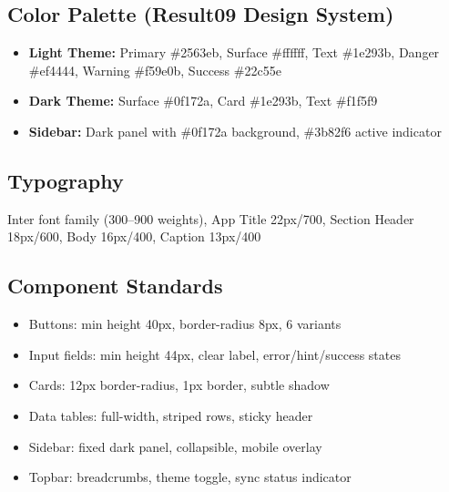 \subsection{Color Palette (Result09 Design System)}
\begin{itemize}[nosep]
    \item \textbf{Light Theme:} Primary \#2563eb, Surface \#ffffff, Text \#1e293b, Danger \#ef4444, Warning \#f59e0b, Success \#22c55e
    \item \textbf{Dark Theme:} Surface \#0f172a, Card \#1e293b, Text \#f1f5f9
    \item \textbf{Sidebar:} Dark panel with \#0f172a background, \#3b82f6 active indicator
\end{itemize}

\subsection{Typography}
Inter font family (300--900 weights), App Title 22px/700, Section Header 18px/600, Body 16px/400, Caption 13px/400

\subsection{Component Standards}
\begin{itemize}[nosep]
    \item Buttons: min height 40px, border-radius 8px, 6 variants
    \item Input fields: min height 44px, clear label, error/hint/success states
    \item Cards: 12px border-radius, 1px border, subtle shadow
    \item Data tables: full-width, striped rows, sticky header
    \item Sidebar: fixed dark panel, collapsible, mobile overlay
    \item Topbar: breadcrumbs, theme toggle, sync status indicator
\end{itemize}

